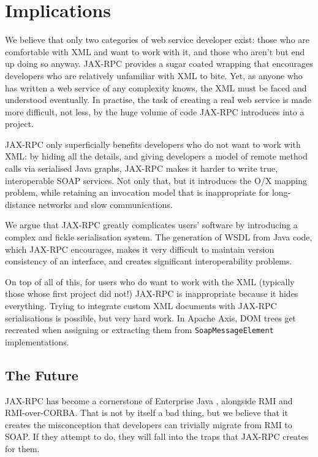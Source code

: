 \section{Implications}
\label{implications}

We believe that only two categories of web service developer exist:
those who are comfortable with XML and want to work with it, and those
who aren't but end up doing so anyway. JAX-RPC provides a sugar coated
wrapping that encourages developers who are relatively unfamiliar with
XML to bite. Yet, as anyone who has written a web service of any
complexity knows, the XML must be faced and understood eventually. In
practise, the task of creating a real web service is made more
difficult, not less, by the huge volume of code JAX-RPC introduces
into a project.

JAX-RPC only superficially benefits developers who do not want to work
with XML: by hiding all the details, and giving developers a model of
remote method calls via serialised Java graphs, JAX-RPC makes it
harder to write true, interoperable SOAP services. Not only that, but
it introduces the O/X mapping problem, while retaining an invocation
model that is inappropriate for long-distance networks and slow
communications.

We argue that JAX-RPC greatly complicates users' software by
introducing a complex and fickle serialisation system. The generation
of WSDL from Java code, which JAX-RPC encourages, makes it very
difficult to maintain version consistency of an interface, and
creates significant interoperability problems.

On top of all of this, for users who do want to work with the XML
(typically those whose first project did not!) JAX-RPC is
inappropriate because it hides everything. Trying to integrate custom
XML documents with JAX-RPC serialisations is possible, but very hard
work. In Apache Axis, DOM trees get recreated when assigning or
extracting them from {\tt SoapMessageElement} implementations.


\subsection{The Future}
\label{implications:future}

JAX-RPC has become a cornerstone of Enterprise Java
\cite{spec:J2EE-14}, alongside RMI and RMI-over-CORBA. That is not by
itself a bad thing, but we believe that it creates the misconception
that developers can trivially migrate from RMI to SOAP. If
they attempt to do, they will fall into the traps that JAX-RPC creates
for them.

